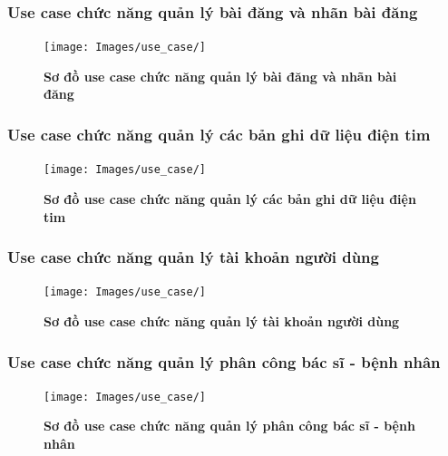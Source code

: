 \documentclass{article}%
\begin{document}
\subsubsection{Use case chức năng quản lý bài đăng và nhãn bài đăng}
  \begin{figure}[H]
    \centering
    \texttt{[image: Images/use\_case/]}
    \caption[Sơ đồ use case chức năng quản lý bài đăng và nhãn bài đăng]{\bfseries \fontsize{12pt}{0pt}
    \selectfont Sơ đồ use case chức năng quản lý bài đăng và nhãn bài đăng}
    \label{hinh21} %
  \end{figure}

\subsubsection{Use case chức năng quản lý các bản ghi dữ liệu điện tim}
  \begin{figure}[H]
    \centering
    \texttt{[image: Images/use\_case/]}
    \caption[Sơ đồ use case chức năng quản lý các bản ghi dữ liệu điện tim]{\bfseries \fontsize{12pt}{0pt}
    \selectfont Sơ đồ use case chức năng quản lý các bản ghi dữ liệu điện tim}
    \label{hinh21} %
  \end{figure}

\subsubsection{Use case chức năng quản lý tài khoản người dùng}
  \begin{figure}[H]
    \centering
    \texttt{[image: Images/use\_case/]}
    \caption[Sơ đồ use case chức năng quản lý tài khoản người dùng]{\bfseries \fontsize{12pt}{0pt}
    \selectfont Sơ đồ use case chức năng quản lý tài khoản người dùng}
    \label{hinh21} %
  \end{figure}

\subsubsection{Use case chức năng quản lý phân công bác sĩ - bệnh nhân}
  \begin{figure}[H]
    \centering
    \texttt{[image: Images/use\_case/]}
    \caption[Sơ đồ use case chức năng quản lý phân công bác sĩ - bệnh nhân]{\bfseries \fontsize{12pt}{0pt}
    \selectfont Sơ đồ use case chức năng quản lý phân công bác sĩ - bệnh nhân}
    \label{hinh21} %
  \end{figure}
\end{document}
